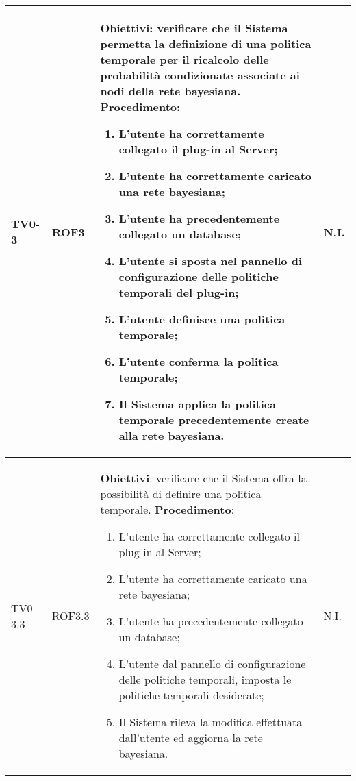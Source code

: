 \begin{longtable}{|C{.15\textwidth}|C{.13\textwidth}|m{.65\textwidth}|C{.08\textwidth}|}
TV0-3 & ROF3 &
	\textbf{Obiettivi}: verificare che il Sistema permetta la definizione di una politica temporale per il ricalcolo delle probabilità condizionate associate ai nodi della rete bayesiana. \newline
	\textbf{Procedimento}:
	\begin{enumerate}
		\item L'utente ha correttamente collegato il plug-in al Server;
		\item L'utente ha correttamente caricato una rete bayesiana;
		\item L'utente ha precedentemente collegato un database;
		\item L'utente si sposta nel pannello di configurazione delle politiche temporali del plug-in;
		\item L'utente definisce una politica temporale;
		\item L'utente conferma la politica temporale;
		\item Il Sistema applica la politica temporale precedentemente create alla rete bayesiana.
	\end{enumerate}
	& N.I. \\
\hline

TV0-3.3 & ROF3.3 &
	\textbf{Obiettivi}: verificare che il Sistema offra la possibilità di definire una politica temporale. \newline
	\textbf{Procedimento}:
	\begin{enumerate}
		\item L'utente ha correttamente collegato il plug-in al Server;
		\item L'utente ha correttamente caricato una rete bayesiana;
		\item L'utente ha precedentemente collegato un database;
		\item L'utente dal pannello di configurazione delle politiche temporali, imposta le politiche temporali desiderate;
		\item Il Sistema rileva la modifica effettuata dall'utente ed aggiorna la rete bayesiana.
	\end{enumerate}
	& N.I. \\
\hline


\end{longtable}
